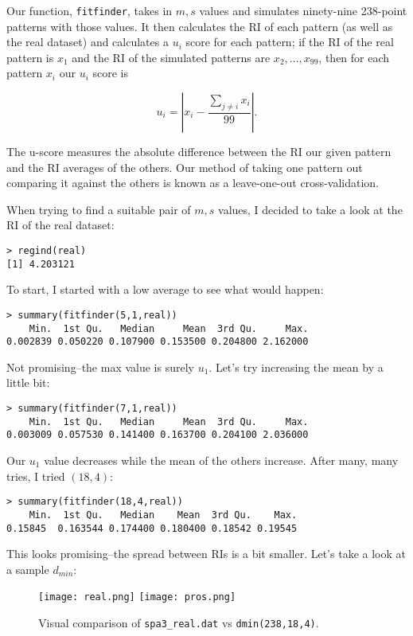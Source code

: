 \documentclass[9pt, oneside, reqno]{article}
\theoremstyle{plain}
\begin{document}
Our function, {\tt fitfinder}, takes in $m,s$ values and simulates ninety-nine 238-point patterns with those values. It then calculates the RI of each pattern (as well as the real dataset) and calculates a $u_i$ score for each pattern; if the RI of the real pattern is $x_1$ and the RI of the simulated patterns are $x_2,\ldots,x_{99}$, then for each pattern $x_i$ our $u_i$ score is

\[ u_i = \left | x_i - \frac{\sum_{j\neq i} x_i}{99} \right|.\]

The u-score measures the absolute difference between the RI our given pattern and the RI averages of the others. Our method of taking one pattern out comparing it against the others is known as a leave-one-out cross-validation. 

When trying to find a suitable pair of $m,s$ values, I decided to take a look at the RI of the real dataset:

\begin{lstlisting}
> regind(real)
[1] 4.203121
\end{lstlisting}

To start, I started with a low average to see what would happen:

\begin{lstlisting}
> summary(fitfinder(5,1,real))
    Min.  1st Qu.   Median     Mean  3rd Qu.     Max. 
0.002839 0.050220 0.107900 0.153500 0.204800 2.162000
\end{lstlisting}

Not promising--the max value is surely $u_1$. Let's try increasing the mean by a little bit:

\begin{lstlisting}
> summary(fitfinder(7,1,real))
    Min.  1st Qu.   Median     Mean  3rd Qu.     Max. 
0.003009 0.057530 0.141400 0.163700 0.204100 2.036000
\end{lstlisting}

Our $u_1$ value decreases while the mean of the others increase. After many, many tries, I tried $(18,4)$:

\begin{lstlisting}
> summary(fitfinder(18,4,real))
    Min.  1st Qu.   Median    Mean  3rd Qu.    Max. 
0.15845  0.163544 0.174400 0.180400 0.18542 0.19545
\end{lstlisting}

This looks promising--the spread between RIs is a bit smaller. Let's take a look at a sample $d_{min}$:

\begin{figure}[ht]
\begin{center}
\texttt{[image: real.png]}
\texttt{[image: pros.png]}
\caption{Visual comparison of {\tt spa3\_real.dat} vs {\tt dmin(238,18,4)}.}
\end{center}
\end{figure}
\end{document}
